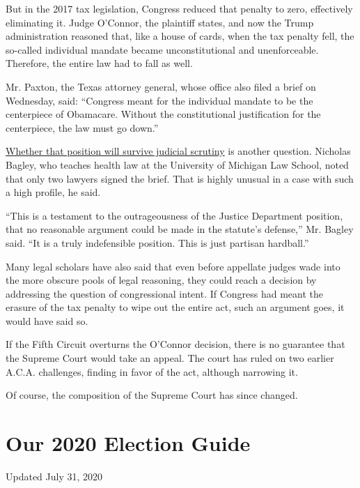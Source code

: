 But in the 2017 tax legislation, Congress reduced that penalty to zero,
effectively eliminating it. Judge O'Connor, the plaintiff states, and
now the Trump administration reasoned that, like a house of cards, when
the tax penalty fell, the so-called individual mandate became
unconstitutional and unenforceable. Therefore, the entire law had to
fall as well.

Mr. Paxton, the Texas attorney general, whose office also filed a brief
on Wednesday, said: ``Congress meant for the individual mandate to be
the centerpiece of Obamacare. Without the constitutional justification
for the centerpiece, the law must go down.''

\href{https://www.nytimes.com/2018/12/15/health/texas-aca-ruling-unconstitutional.html?searchResultPosition=1}{Whether
that position will survive judicial scrutiny} is another question.
Nicholas Bagley, who teaches health law at the University of Michigan
Law School, noted that only two lawyers signed the brief. That is highly
unusual in a case with such a high profile, he said.

``This is a testament to the outrageousness of the Justice Department
position, that no reasonable argument could be made in the statute's
defense,'' Mr. Bagley said. ``It is a truly indefensible position. This
is just partisan hardball.''

Many legal scholars have also said that even before appellate judges
wade into the more obscure pools of legal reasoning, they could reach a
decision by addressing the question of congressional intent. If Congress
had meant the erasure of the tax penalty to wipe out the entire act,
such an argument goes, it would have said so.

If the Fifth Circuit overturns the O'Connor decision, there is no
guarantee that the Supreme Court would take an appeal. The court has
ruled on two earlier A.C.A. challenges, finding in favor of the act,
although narrowing it.

Of course, the composition of the Supreme Court has since changed.

\hypertarget{our-2020-election-guide}{%
\section{Our 2020 Election Guide}\label{our-2020-election-guide}}

Updated July 31, 2020

